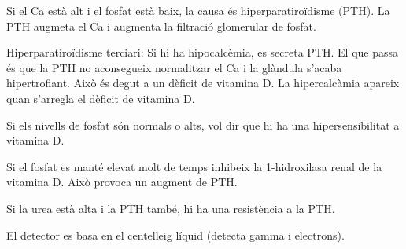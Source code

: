 Si el Ca està alt i el fosfat està baix, la causa és
hiperparatiroïdisme (PTH). La PTH augmeta el Ca i augmenta la
filtració glomerular de fosfat.

Hiperparatiroïdisme terciari: Si hi ha hipocalcèmia, es secreta
PTH. El que passa és que la PTH no aconsegueix normalitzar el Ca i la
glàndula s'acaba hipertrofiant. Això és degut a un dèficit de vitamina
D. La hipercalcàmia apareix quan s'arregla el dèficit de vitamina D.

Si els nivells de fosfat són normals o alts, vol dir que hi ha una
hipersensibilitat a vitamina D.

Si el fosfat es manté elevat molt de temps inhibeix la 1-hidroxilasa
renal de la vitamina D. Això provoca un augment de PTH.

Si la urea està alta i la PTH també, hi ha una resistència a la PTH.

El detector es basa en el centelleig líquid (detecta gamma i electrons).